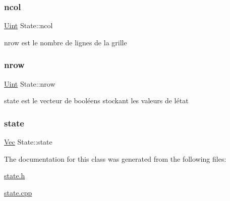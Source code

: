 \subsubsection{\texorpdfstring{ncol}{ncol}}
{\footnotesize\ttfamily \mbox{\hyperlink{state_8h_a4840c4503b7d10cea5e08416eb3716f1}{Uint}} State\+::ncol\hspace{0.3cm}{\ttfamily [private]}}



nrow est le nombre de lignes de la grille 

\mbox{\label{class_state_ae3394f187fa7e76395a620c96f03d1a2}} 
\subsubsection{\texorpdfstring{nrow}{nrow}}
{\footnotesize\ttfamily \mbox{\hyperlink{state_8h_a4840c4503b7d10cea5e08416eb3716f1}{Uint}} State\+::nrow\hspace{0.3cm}{\ttfamily [private]}}



state est le vecteur de booléens stockant les valeurs de l\textquotesingle{}état 

\mbox{\label{class_state_a7b36c08c9e5e334a2bbd6c4f38f75d21}} 
\subsubsection{\texorpdfstring{state}{state}}
{\footnotesize\ttfamily \mbox{\hyperlink{state_8h_aa074fbe250e9d18fbe221bb7473158ad}{Vec}} State\+::state\hspace{0.3cm}{\ttfamily [private]}}



The documentation for this class was generated from the following files\+:\begin{DoxyCompactItemize}
\item 
\mbox{\hyperlink{state_8h}{state.\+h}}\item 
\mbox{\hyperlink{state_8cpp}{state.\+cpp}}\end{DoxyCompactItemize}
